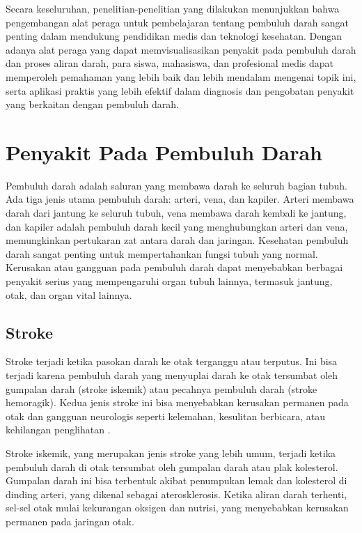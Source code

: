 Secara keseluruhan, penelitian-penelitian yang dilakukan menunjukkan bahwa pengembangan alat peraga untuk pembelajaran tentang pembuluh darah sangat penting dalam mendukung pendidikan medis dan teknologi kesehatan. Dengan adanya alat peraga yang dapat memvisualisasikan penyakit pada pembuluh darah dan proses aliran darah, para siswa, mahasiswa, dan profesional medis dapat memperoleh pemahaman yang lebih baik dan lebih mendalam mengenai topik ini, serta aplikasi praktis yang lebih efektif dalam diagnosis dan pengobatan penyakit yang berkaitan dengan pembuluh darah. 


\section{Penyakit Pada Pembuluh Darah}
\label{subsec:penyakitpembuluh}

Pembuluh darah adalah saluran yang membawa darah ke seluruh bagian tubuh. Ada tiga jenis utama pembuluh darah: arteri, vena, dan kapiler. Arteri membawa darah dari jantung ke seluruh tubuh, vena membawa darah kembali ke jantung, dan kapiler adalah pembuluh darah kecil yang menghubungkan arteri dan vena, memungkinkan pertukaran zat antara darah dan jaringan. Kesehatan pembuluh darah sangat penting untuk mempertahankan fungsi tubuh yang normal. Kerusakan atau gangguan pada pembuluh darah dapat menyebabkan berbagai penyakit serius yang mempengaruhi organ tubuh lainnya, termasuk jantung, otak, dan organ vital lainnya.

\subsection{Stroke}
\label{subsubsec:stroke}

Stroke terjadi ketika pasokan darah ke otak terganggu atau terputus. Ini bisa terjadi karena pembuluh darah yang menyuplai darah ke otak tersumbat oleh gumpalan darah (stroke iskemik) atau pecahnya pembuluh darah (stroke hemoragik). Kedua jenis stroke ini bisa menyebabkan kerusakan permanen pada otak dan gangguan neurologis seperti kelemahan, kesulitan berbicara, atau kehilangan penglihatan \cite{asa2024aboutstroke}. 

Stroke iskemik, yang merupakan jenis stroke yang lebih umum, terjadi ketika pembuluh darah di otak tersumbat oleh gumpalan darah atau plak kolesterol. Gumpalan darah ini bisa terbentuk akibat penumpukan lemak dan kolesterol di dinding arteri, yang dikenal sebagai aterosklerosis. Ketika aliran darah terhenti, sel-sel otak mulai kekurangan oksigen dan nutrisi, yang menyebabkan kerusakan permanen pada jaringan otak.

